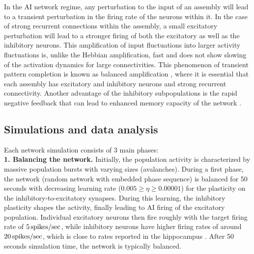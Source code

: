     In the AI network regime, any perturbation to the input of an assembly will
    lead to a transient perturbation in the firing rate of the neurons within
    it. In the case of strong recurrent connections within the assembly, a small
    excitatory perturbation will lead to a stronger firing of both the
    excitatory as well as the inhibitory neurons. This amplification of input
    fluctuations into larger activity fluctuations is, unlike the Hebbian
    amplification, fast and does not show slowing of the activation dynamics
    for large connectivities. This phenomenon of transient pattern completion
    is known as balanced amplification \citep{Murphy2009}, where it is essential
    that each assembly has excitatory and inhibitory neurons and strong
    recurrent connectivity. Another advantage of the inhibitory subpopulations
    is the rapid negative feedback that can lead to enhanced memory capacity of
    the network \citep{Kammerer2013}.

  \subsection{Simulations and data analysis}
    Each network simulation consists of 3 main phases:\\
    \textbf{1. Balancing the network.} Initially, the population activity is
      characterized by massive population bursts with varying sizes
      (avalanches). During a first phase, the network (random network with
      embedded phase sequence) is balanced for 50 seconds with decreasing
      learning rate ($0.005 \geq \eta \geq 0.00001$) for the plasticity on the
      inhibitory-to-excitatory synapses. During this learning, the inhibitory
      plasticity shapes the activity, finally leading to AI firing of the
      excitatory population. Individual excitatory neurons then fire roughly
      with the target firing rate of $5 \, \rm spikes/sec$, while inhibitory neurons
      have higher firing rates of around $20 \, \rm spikes/sec$, which is close to
      rates reported in the hippocampus \citep{Csicsvari2000, Cheng2013}.
      After 50 seconds simulation time, the network is typically balanced.

